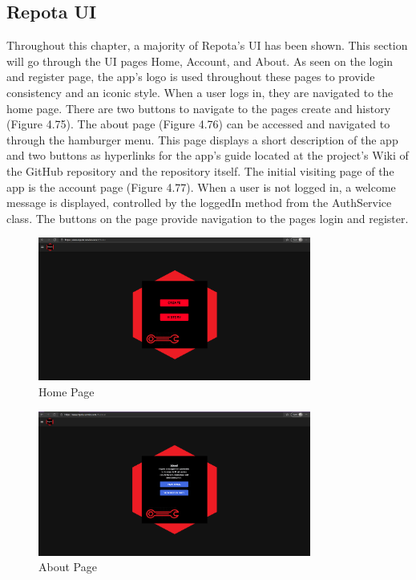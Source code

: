 \subsection{Repota UI}
Throughout this chapter, a majority of Repota's UI has been shown. This section will go through the UI pages Home, Account, and About. As seen on the login and register page, the app's logo is used throughout these pages to provide consistency and an iconic style. When a user logs in, they are navigated to the home page. There are two buttons to navigate to the pages create and history (Figure 4.75). The about page (Figure 4.76) can be accessed and navigated to through the hamburger menu. This page displays a short description of the app and two buttons as hyperlinks for the app's guide located at the project's Wiki of the GitHub repository and the repository itself. The initial visiting page of the app is the account page (Figure 4.77). When a user is not logged in, a welcome message is displayed, controlled by the loggedIn method from the AuthService class. The buttons on the page provide navigation to the pages login and register. 

\begin{figure}[H]
    \centering
    \caption{Home Page}
    \label{image:homePage}
    \includegraphics[width=0.8\textwidth]{images/repota/UI/home-page.png}
\end{figure}

\begin{figure}[H]
    \centering
    \caption{About Page}
    \label{image:aboutPage}
    \includegraphics[width=0.8\textwidth]{images/repota/UI/about.png}
\end{figure}

